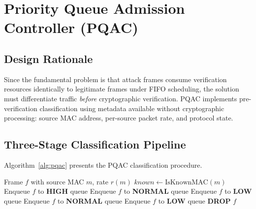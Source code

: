 \documentclass{ieeeaccess}
\begin{document}
\section{Priority Queue Admission Controller (PQAC)}

\subsection{Design Rationale}
Since the fundamental problem is that attack frames consume verification resources identically to legitimate frames under FIFO scheduling, the solution must differentiate traffic \emph{before} cryptographic verification. PQAC implements pre-verification classification using metadata available without cryptographic processing: source MAC address, per-source packet rate, and protocol state.

\subsection{Three-Stage Classification Pipeline}
Algorithm~\ref{alg:pqac} presents the PQAC classification procedure.

\begin{algorithm}[t]
\caption{PQAC Classification Algorithm: Pre-verification traffic triage enables $<$1\,$\mu$s classification overhead, achieving 1,556$\times$ latency improvement over FIFO}
\label{alg:pqac}
\begin{algorithmic}[1]
\REQUIRE Frame $f$ with source MAC $m$, rate $r(m)$
\STATE $\textit{known} \leftarrow \text{IsKnownMAC}(m)$
        \STATE Enqueue $f$ to \textbf{HIGH} queue 
        \STATE Enqueue $f$ to \textbf{NORMAL} queue 
    \ELSE
        \STATE Enqueue $f$ to \textbf{LOW} queue 
    \ENDIF
\ELSE
        \STATE Enqueue $f$ to \textbf{NORMAL} queue 
    \ELSE
            \STATE Enqueue $f$ to \textbf{LOW} queue 
        \ELSE
            \STATE \textbf{DROP} $f$ 
        \ENDIF
    \ENDIF
\ENDIF
\end{algorithmic}
\end{algorithm}
\end{document}
